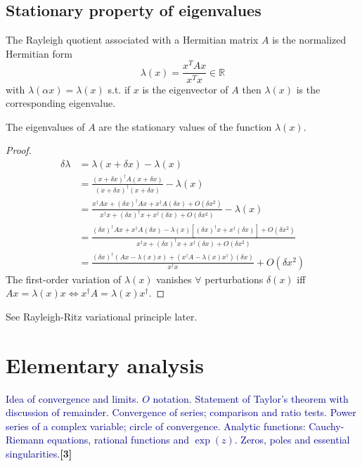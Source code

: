 \documentclass[a4paper]{article}
\begin{document}
\subsection{Stationary property of eigenvalues}
\begin{defi}
The Rayleigh quotient associated with a Hermitian matrix $A$ is the normalized Hermitian form 
\begin{equation}
\lambda(x)=\frac{x^TAx}{x^Tx}\in\mathbb{R}\tag{5.5}
\end{equation}
with $\lambda(\alpha x)=\lambda(x)$ s.t. if $x$ is the eigenvector of $A$ then $\lambda(x)$ is the corresponding eigenvalue.
\end{defi}
\begin{prop}
The eigenvalues of $A$ are the stationary values of the function $\lambda(x)$.
\end{prop}
\begin{proof}
\begin{align}
    \delta\lambda&=\lambda(x+\delta x)-\lambda(x)\nonumber\\&=\frac{(x+\delta x)^\dag A(x+\delta x)}{(x+\delta x)^\dag(x+\delta x)}-\lambda(x)\nonumber\\&=\frac{x^\dag Ax+(\delta x)^\dag Ax+x^\dag A(\delta x)+O(\delta x^2)}{x^\dag x+(\delta x)^\dag x+x^\dag(\delta x)+O(\delta x^2)}-\lambda(x)\nonumber\\&=\frac{(\delta x)^\dag Ax+x^\dag A(\delta x)-\lambda(x)[(\delta x)^\dag x+x^\dag(\delta x)]+O(\delta x^2)}{x^\dag x+(\delta x)^\dag x+x^\dag(\delta x)+O(\delta x^2)}\nonumber\\&=\frac{(\delta x)^\dag(Ax-\lambda(x)x)+(x^\dag A-\lambda(x)x^\dag)(\delta x)}{x^\dag x}+O(\delta x^2)\nonumber
\end{align}
The first-order variation of $\lambda(x)$ vanishes $\forall$ perturbations $\delta(x)$ iff $Ax=\lambda(x)x\iff x^\dag A=\lambda(x)x^\dag$.
\end{proof}
See Rayleigh-Ritz variational principle later.
\newpage
\section{Elementary analysis}
{\small\textcolor{darkblue}{Idea of convergence and limits. $O$ notation. Statement of Taylor's theorem with discussion of remainder. Convergence of series; comparison and ratio tests. Power series of a complex variable; circle of convergence. Analytic functions: Cauchy-Riemann equations, rational functions and $\exp(z)$. Zeros, poles and essential singularities.}\hfill\textbf{[3]}}
\end{document}
